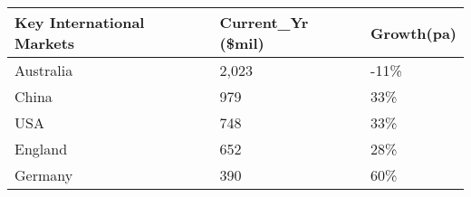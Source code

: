 \begin{tabular}[t]{|p{4cm}|p{2cm}|p{1.3cm}|}
  \hline
Key International Markets & Current\_Yr (\$mil) & Growth(pa) \\ 
  \hline
Australia & 2,023 & -11\% \\ 
  China &   979 & 33\% \\ 
  USA &   748 & 33\% \\ 
  England &   652 & 28\% \\ 
  Germany &   390 & 60\% \\ 
   \hline
\end{tabular}
